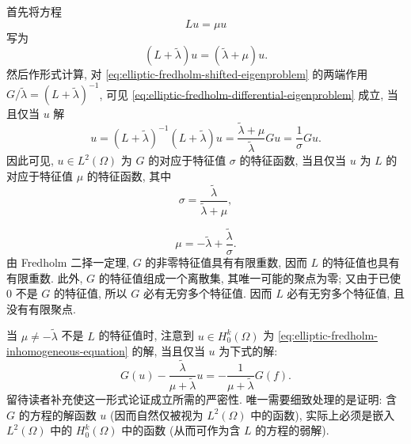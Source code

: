 \begin{Proof}
首先将方程
\begin{equation}\label{eq:elliptic-fredholm-differential-eigenproblem}
Lu=\mu u
\end{equation}
写为
\begin{equation}\label{eq:elliptic-fredholm-shifted-eigenproblem}
(L+\widetilde\lambda)u=(\widetilde\lambda+\mu)u.
\end{equation}
然后作形式计算, 对 \eqref{eq:elliptic-fredholm-shifted-eigenproblem} 的两端作用 $G/\widetilde\lambda=(L+\widetilde\lambda)^{-1}$, 可见 \eqref{eq:elliptic-fredholm-differential-eigenproblem} 成立, 当且仅当 $u$ 解
\begin{equation}\label{eq:elliptic-fredholm-solution-operator-eigenrelation}
u=(L+\widetilde\lambda)^{-1}(L+\widetilde\lambda)u=\dfrac{\widetilde\lambda+\mu}{\widetilde\lambda}Gu=\dfrac{1}{\sigma}Gu.
\end{equation}
因此可见, $u\in L^2(\Omega)$ 为 $G$ 的对应于特征值 $\sigma$ 的特征函数, 当且仅当 $u$ 为 $L$ 的对应于特征值 $\mu$ 的特征函数, 其中
\begin{equation}\label{eq:elliptic-fredholm-sigma-from-mu}
\sigma=\dfrac{\widetilde\lambda}{\widetilde\lambda+\mu},
\end{equation}

\begin{equation}\label{eq:elliptic-fredholm-mu-from-sigma}
\mu=-\widetilde\lambda+\dfrac{\widetilde\lambda}{\sigma}.
\end{equation}
由 Fredholm 二择一定理, $G$ 的非零特征值具有有限重数, 因而 $L$ 的特征值也具有有限重数. 此外, $G$ 的特征值组成一个离散集, 其唯一可能的聚点为零; 又由于已使 $0$ 不是 $G$ 的特征值, 所以 $G$ 必有无穷多个特征值. 因而 $L$ 必有无穷多个特征值, 且没有有限聚点.

当 $\mu\ne-\widetilde\lambda$ 不是 $L$ 的特征值时, 注意到 $u\in H_0^k(\Omega)$ 为 \eqref{eq:elliptic-fredholm-inhomogeneous-equation} 的解, 当且仅当 $u$ 为下式的解:
\begin{equation}\label{eq:elliptic-fredholm-equivalent-compact-equation}
G(u)-\dfrac{\widetilde\lambda}{\mu+\widetilde\lambda}u=-\dfrac{1}{\mu+\widetilde\lambda}G(f).
\end{equation}
留待读者补充使这一形式论证成立所需的严密性. 唯一需要细致处理的是证明: 含 $G$ 的方程的解函数 $u$ (因而自然仅被视为 $L^2(\Omega)$ 中的函数), 实际上必须是嵌入 $L^2(\Omega)$ 中的 $H_0^k(\Omega)$ 中的函数 (从而可作为含 $L$ 的方程的弱解).
\end{Proof}
